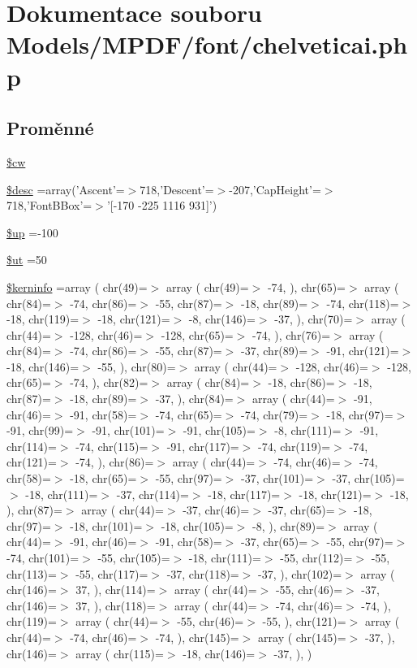 \hypertarget{chelveticai_8php}{\section{Dokumentace souboru Models/\-M\-P\-D\-F/font/chelveticai.php}
\label{chelveticai_8php}
}
\subsection*{Proměnné}
\begin{DoxyCompactItemize}
\item 
\hyperlink{chelveticai_8php_ac2951b03dbb0317e6c61ec920b7479dc}{\$cw}
\item 
\hyperlink{chelveticai_8php_a31059b9e4d0c5af34df20da32232ea9a}{\$desc} =array('Ascent'=$>$718,'Descent'=$>$-\/207,'Cap\-Height'=$>$718,'Font\-B\-Box'=$>$'\mbox{[}-\/170 -\/225 1116 931\mbox{]}')
\item 
\hyperlink{chelveticai_8php_a6b5ad2ac55f9df46e8f34e78fbd6f176}{\$up} =-\/100
\item 
\hyperlink{chelveticai_8php_aadd3f841051043ee58e587e840e8dd0b}{\$ut} =50
\item 
\hyperlink{chelveticai_8php_ab4bb7d3b0332c517f6a42a1924f01000}{\$kerninfo} =array ( chr(49)=$>$ array ( chr(49)=$>$ -\/74, ), chr(65)=$>$ array ( chr(84)=$>$ -\/74, chr(86)=$>$ -\/55, chr(87)=$>$ -\/18, chr(89)=$>$ -\/74, chr(118)=$>$ -\/18, chr(119)=$>$ -\/18, chr(121)=$>$ -\/8, chr(146)=$>$ -\/37, ), chr(70)=$>$ array ( chr(44)=$>$ -\/128, chr(46)=$>$ -\/128, chr(65)=$>$ -\/74, ), chr(76)=$>$ array ( chr(84)=$>$ -\/74, chr(86)=$>$ -\/55, chr(87)=$>$ -\/37, chr(89)=$>$ -\/91, chr(121)=$>$ -\/18, chr(146)=$>$ -\/55, ), chr(80)=$>$ array ( chr(44)=$>$ -\/128, chr(46)=$>$ -\/128, chr(65)=$>$ -\/74, ), chr(82)=$>$ array ( chr(84)=$>$ -\/18, chr(86)=$>$ -\/18, chr(87)=$>$ -\/18, chr(89)=$>$ -\/37, ), chr(84)=$>$ array ( chr(44)=$>$ -\/91, chr(46)=$>$ -\/91, chr(58)=$>$ -\/74, chr(65)=$>$ -\/74, chr(79)=$>$ -\/18, chr(97)=$>$ -\/91, chr(99)=$>$ -\/91, chr(101)=$>$ -\/91, chr(105)=$>$ -\/8, chr(111)=$>$ -\/91, chr(114)=$>$ -\/74, chr(115)=$>$ -\/91, chr(117)=$>$ -\/74, chr(119)=$>$ -\/74, chr(121)=$>$ -\/74, ), chr(86)=$>$ array ( chr(44)=$>$ -\/74, chr(46)=$>$ -\/74, chr(58)=$>$ -\/18, chr(65)=$>$ -\/55, chr(97)=$>$ -\/37, chr(101)=$>$ -\/37, chr(105)=$>$ -\/18, chr(111)=$>$ -\/37, chr(114)=$>$ -\/18, chr(117)=$>$ -\/18, chr(121)=$>$ -\/18, ), chr(87)=$>$ array ( chr(44)=$>$ -\/37, chr(46)=$>$ -\/37, chr(65)=$>$ -\/18, chr(97)=$>$ -\/18, chr(101)=$>$ -\/18, chr(105)=$>$ -\/8, ), chr(89)=$>$ array ( chr(44)=$>$ -\/91, chr(46)=$>$ -\/91, chr(58)=$>$ -\/37, chr(65)=$>$ -\/55, chr(97)=$>$ -\/74, chr(101)=$>$ -\/55, chr(105)=$>$ -\/18, chr(111)=$>$ -\/55, chr(112)=$>$ -\/55, chr(113)=$>$ -\/55, chr(117)=$>$ -\/37, chr(118)=$>$ -\/37, ), chr(102)=$>$ array ( chr(146)=$>$ 37, ), chr(114)=$>$ array ( chr(44)=$>$ -\/55, chr(46)=$>$ -\/37, chr(146)=$>$ 37, ), chr(118)=$>$ array ( chr(44)=$>$ -\/74, chr(46)=$>$ -\/74, ), chr(119)=$>$ array ( chr(44)=$>$ -\/55, chr(46)=$>$ -\/55, ), chr(121)=$>$ array ( chr(44)=$>$ -\/74, chr(46)=$>$ -\/74, ), chr(145)=$>$ array ( chr(145)=$>$ -\/37, ), chr(146)=$>$ array ( chr(115)=$>$ -\/18, chr(146)=$>$ -\/37, ), )

\end{DoxyCompactItemize}
